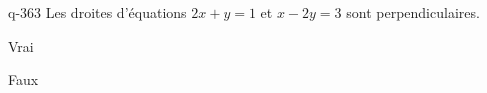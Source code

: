 \begin{truefalse}{q-363}
Les droites d'équations $2x+y=1$ et $x-2y=3$ sont perpendiculaires.
\item* Vrai
\item Faux
\end{truefalse}

